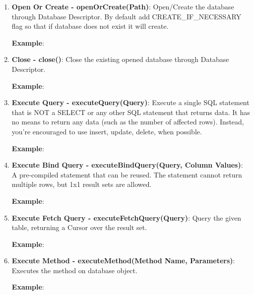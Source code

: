 \begin{enumerate}

	\item \small \textbf{Open Or Create - openOrCreate(Path)}: Open/Create the database through Database Descriptor. By default add CREATE\_IF\_NECESSARY flag so that if database does not exist it will create.

		\textbf{Example}: 
			


	\item \small \textbf{Close - close()}: Close the existing opened database through Database Descriptor.

		\textbf{Example}: 
			

	\item \small \textbf{Execute Query - executeQuery(Query)}: Execute a single SQL statement that is NOT a SELECT or any other SQL statement that returns data. It has no means to return any data (such as the number of affected rows). Instead, you're encouraged to use insert, update, delete, when possible. 
	
		\textbf{Example}: 
			

	\item \small \textbf{Execute Bind Query - executeBindQuery(Query, Column Values)}: A pre-compiled statement that can be reused. The statement cannot return multiple rows, but 1x1 result sets are allowed.
 
		\textbf{Example}: 
			

	\item \small \textbf{Execute Fetch Query - executeFetchQuery(Query)}: Query the given table, returning a Cursor over the result set.

		\textbf{Example}: 
			

	\item \small \textbf{Execute Method - executeMethod(Method Name, Parameters)}: Executes the method on database object.

		\textbf{Example}: 
			

\end{enumerate}


